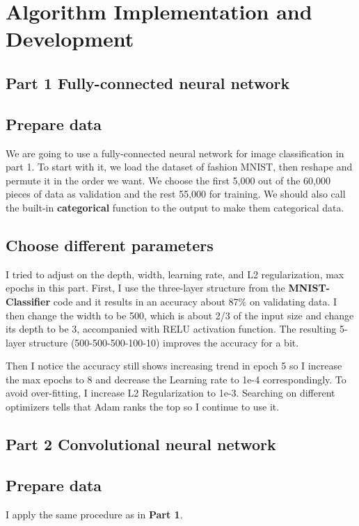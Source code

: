 \documentclass[10pt]{article}
\begin{document}
\section{Algorithm Implementation and Development}
\subsection*{Part 1 Fully-connected neural network}
\subsection*{Prepare data}
We are going to use a fully-connected neural network for image classification in part 1. To start with it, we load the dataset of fashion MNIST, then reshape and permute it in the order we want. We choose the first 5,000 out of the 60,000 pieces of data as validation and the rest 55,000 for training. We should also call the built-in \textbf{categorical} function to the output to make them categorical data.

\subsection*{Choose different parameters}
I tried to adjust on the depth, width, learning rate, and L2 regularization, max epochs in this part. First, I use the three-layer structure from the \textbf{MNIST-Classifier} code and it results in an accuracy about 87$\%$ on validating data. I then change the width to be 500, which is about 2/3 of the input size and change its depth to be 3, accompanied with RELU activation function. The resulting 5-layer structure (500-500-500-100-10) improves the accuracy for a bit.
\par
\vskip 0.1cm
Then I notice the accuracy still shows increasing trend in epoch 5 so I increase the max epochs to 8 and decrease the Learning rate to 1e-4 correspondingly. To avoid over-fitting, I increase L2 Regularization to 1e-3. Searching on different optimizers tells that Adam ranks the top so I continue to use it.


\subsection*{Part 2 Convolutional neural network}
\subsection*{Prepare data}
I apply the same procedure as in \textbf{Part 1}.
\end{document}

